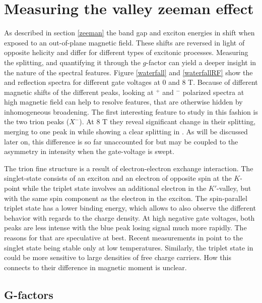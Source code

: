 \section{Measuring the valley zeeman effect}

As described in section \ref{zeeman} the band gap and exciton energies in \tmds shift when exposed to an out-of-plane magnetic field. These shifts are reversed in light of opposite helicity and differ for different types of excitonic processes. Measuring the splitting, and quantifying it through the $g$-factor can yield a deeper insight in the nature of the spectral features. Figure \ref{waterfall} and \ref{waterfallRF} show the \pl and reflection spectra for different gate voltages at 0 and 8 T. Because of different magnetic shifts of the different peaks, looking at \sigma$^+$ and \sigma$^-$ polarized spectra at high magnetic field can help to resolve features, that are otherwise hidden by inhomogeneous broadening. The first interesting feature to study in this fashion is the two trion peaks ($X^-$). At 8 T they reveal significant change in their splitting, merging to one peak in \sigp while showing a clear splitting in \sigm. As will be discussed later on, this difference is so far unaccounted for but may be coupled to the asymmetry in intensity when the gate-voltage is swept.

The trion fine structure is a result of electron-electron exchange interaction. The singlet-state consists of an exciton and an electron of opposite spin at the $K$-point while the triplet state involves an additional electron in the $K'$-valley, but with the same spin component as the electron in the exciton. The spin-parallel triplet state has a lower binding energy, which allows to also observe the different behavior with regards to the charge density. At high negative gate voltages, both peaks are less intense with the blue peak losing signal much more rapidly. The reasons for that are speculative at best. Recent measurements in \ws point to the singlet state being stable only at low temperatures\cite{vaclavkova_singlet_2018}. Similarly, the triplet state in \wse could be more sensitive to large densities of free charge carriers. How this connects to their difference in magnetic moment is unclear.

\subsection{G-factors}

